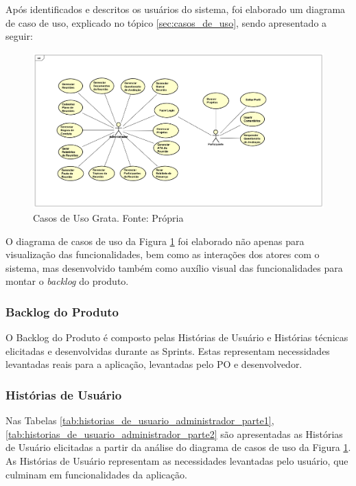Após identificados e descritos os usuários do sistema, foi elaborado um diagrama de caso de uso, explicado no tópico \ref{sec:casos_de_uso}, sendo apresentado a seguir:

\begin{figure}[H]
	\centering
	\includegraphics[width=1.0\textwidth]{figuras/casosDeUso.png}
	\caption{Casos de Uso Grata. Fonte: Própria}
	\label{img:casos_de_uso_grata}
\end{figure}

O diagrama de casos de uso da Figura \ref{img:casos_de_uso_grata} foi elaborado não apenas para visualização das funcionalidades, bem como as interações dos atores com o sistema, mas desenvolvido também como auxílio visual das funcionalidades para montar o \textit{backlog} do produto.

\subsubsection{Backlog do Produto}

O Backlog do Produto é composto pelas Histórias de Usuário e Histórias técnicas
elicitadas e desenvolvidas durante as Sprints. Estas representam necessidades levantadas reais para a aplicação, levantadas pelo PO e desenvolvedor.

\subsubsection{Histórias de Usuário}

Nas Tabelas \ref{tab:historias_de_usuario_administrador_parte1}, \ref{tab:historias_de_usuario_administrador_parte2} são apresentadas as Histórias de Usuário elicitadas a partir da análise do diagrama de casos de uso da Figura \ref{img:casos_de_uso_grata}. 
As Histórias de Usuário representam as necessidades levantadas pelo usuário, que culminam em funcionalidades da aplicação. 

